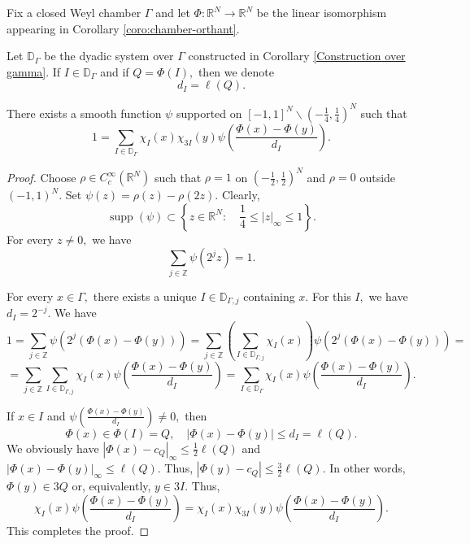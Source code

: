 \documentclass[12pt]{amsart}
\begin{document}
\begin{nota}
Fix a closed Weyl chamber $\Gamma$ and let $\Phi:\mathbb{R}^N\to\mathbb{R}^N$ be the linear isomorphism appearing in Corollary \ref{coro:chamber-orthant}.

Let $\mathbb{D}_{\Gamma}$ be the dyadic system over $\Gamma$ constructed in
Corollary \ref{Construction over gamma}. If $I\in\mathbb{D}_{\Gamma}$ and if $Q=\Phi(I),$ then we denote
$$d_I=\ell(Q).$$
\end{nota}

\begin{lemma} There exists a smooth function $\psi$ supported on $[-1,1]^N\backslash(-\frac14,\frac14)^N$ such that
$$1=\sum_{I\in\mathbb{D}_{\Gamma}}\chi_I(x)\chi_{3I}(y)\psi(\frac{\Phi(x)-\Phi(y)}{d_I}).$$
\end{lemma}
\begin{proof} Choose $\rho\in C_c^{\infty}(\mathbb{R}^N)$ such that $\rho=1$ on $(-\frac12,\frac12)^N$ and $\rho=0$ outside $(-1,1)^N.$ Set $\psi(z)=\rho(z)-\rho(2z).$ Clearly,
\begin{equation}\label{eq:rankone-psi-support}
\operatorname{supp}(\psi)\subset
\left\{z\in\mathbb{R}^N:\quad 
\frac14\leq |z|_{\infty}\leq 1\right\}.
\end{equation}
For every $z\neq0,$ we have
\begin{equation}\label{eq:rankone-psi-partition}
\sum_{j\in\mathbb{Z}}\psi(2^jz)=1.
\end{equation}

For every $x\in\Gamma,$ there exists a unique $I\in\mathbb{D}_{\Gamma,j}$ containing $x.$ For this $I,$ we have $d_I=2^{-j}.$ We have
$$1=\sum_{j\in\mathbb{Z}}\psi(2^j(\Phi(x)-\Phi(y)))=\sum_{j\in\mathbb{Z}}(\sum_{I\in\mathbb{D}_{\Gamma,j}}\chi_I(x))\psi(2^j(\Phi(x)-\Phi(y)))=$$
$$=\sum_{j\in\mathbb{Z}}\sum_{I\in\mathbb{D}_{\Gamma,j}}\chi_I(x)\psi(\frac{\Phi(x)-\Phi(y)}{d_I})=\sum_{I\in\mathbb{D}_{\Gamma}}\chi_I(x)\psi(\frac{\Phi(x)-\Phi(y)}{d_I}).$$

If $x\in I$ and $\psi(\frac{\Phi(x)-\Phi(y)}{d_I})\neq 0,$ then
$$\Phi(x)\in\Phi(I)=Q,\quad |\Phi(x)-\Phi(y)|\leq d_I=\ell(Q).$$
We obviously have $|\Phi(x)-c_Q|_{\infty}\leq\frac12\ell(Q)$ and $|\Phi(x)-\Phi(y)|_{\infty}\leq\ell(Q).$ Thus, $|\Phi(y)-c_Q|\leq\frac32\ell(Q).$ In other words, $\Phi(y)\in 3Q$ or, equivalently, $y\in 3I.$ Thus,
$$\chi_I(x)\psi(\frac{\Phi(x)-\Phi(y)}{d_I})=\chi_I(x)\chi_{3I}(y)\psi(\frac{\Phi(x)-\Phi(y)}{d_I}).$$
This completes the proof.
\end{proof}
\end{document}
